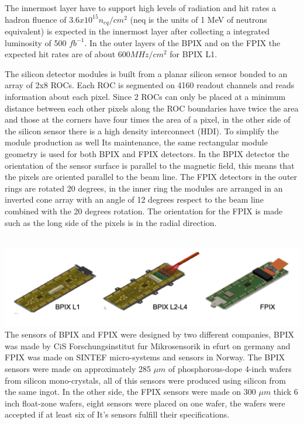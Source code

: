 The innermost layer have to support high levels of radiation and hit rates a hadron fluence of $3.6x10^{15} n_{eq}/cm^{2}$ (neq is the units of 1 MeV of neutrons equivalent) is expected in the innermost layer after collecting a integrated luminosity of 500 $fb^{-1}$. In the outer layers of the BPIX and on the FPIX the expected hit rates are of about $600 MHz/cm^{2}$ for BPIX L1. 

The silicon detector modules is built from a planar silicon sensor bonded to an array of 2x8 ROCs. Each ROC is segmented on 4160 readout channels and reads information about each pixel. Since 2 ROCs can only be placed at a minimum distance between each other pixels along the ROC boundaries have twice the area and those at the corners have four times the area of a pixel, in the other side of the silicon sensor there is a high density interconnect (HDI). To simplify the module production as well Its maintenance, the same rectangular module geometry is used for both BPIX and FPIX detectors. In the BPIX detector the orientation of the sensor surface is parallel to the magnetic field, this means that the pixels are oriented parallel to the beam line. The FPIX detectors in the outer rings are rotated 20 degrees, in the inner ring the modules are arranged in an inverted cone array with an angle of 12 degrees respect to the beam line combined with the 20 degrees rotation. The orientation for the FPIX is made such as the long side of the pixels is in the radial direction.  

\\
\includegraphics[scale=1]{BPIXFPIX.png}
\\
The sensors of BPIX and FPIX were designed by two different companies, BPIX was made by CiS Forschungsinstitut fur Mikrosensorik in efurt on germany and FPIX was made on SINTEF micro-systems and sensors in Norway. The BPIX sensors were made on approximately 285 $\mu m$ of phosphorous-dope 4-inch wafers from silicon mono-crystals, all of this sensors were produced using silicon from the same ingot. In the other side, the FPIX sensors were made on 300 $\mu m$ thick 6 inch float-zone wafers, eight sensors were placed on one wafer, the wafers were accepted if at least six of It's sensors fulfill their specifications. 

